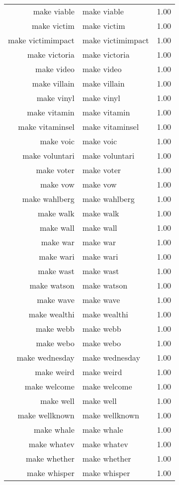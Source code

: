 \begin{table}[ht]
\begin{tabular}{rlr}
  make viable & make viable & 1.00 \\ 
  make victim & make victim & 1.00 \\ 
  make victimimpact & make victimimpact & 1.00 \\ 
  make victoria & make victoria & 1.00 \\ 
  make video & make video & 1.00 \\ 
  make villain & make villain & 1.00 \\ 
  make vinyl & make vinyl & 1.00 \\ 
  make vitamin & make vitamin & 1.00 \\ 
  make vitaminsel & make vitaminsel & 1.00 \\ 
  make voic & make voic & 1.00 \\ 
  make voluntari & make voluntari & 1.00 \\ 
  make voter & make voter & 1.00 \\ 
  make vow & make vow & 1.00 \\ 
  make wahlberg & make wahlberg & 1.00 \\ 
  make walk & make walk & 1.00 \\ 
  make wall & make wall & 1.00 \\ 
  make war & make war & 1.00 \\ 
  make wari & make wari & 1.00 \\ 
  make wast & make wast & 1.00 \\ 
  make watson & make watson & 1.00 \\ 
  make wave & make wave & 1.00 \\ 
  make wealthi & make wealthi & 1.00 \\ 
  make webb & make webb & 1.00 \\ 
  make webo & make webo & 1.00 \\ 
  make wednesday & make wednesday & 1.00 \\ 
  make weird & make weird & 1.00 \\ 
  make welcome & make welcome & 1.00 \\ 
  make well & make well & 1.00 \\ 
  make wellknown & make wellknown & 1.00 \\ 
  make whale & make whale & 1.00 \\ 
  make whatev & make whatev & 1.00 \\ 
  make whether & make whether & 1.00 \\ 
  make whisper & make whisper & 1.00 \\ 

\end{tabular}
\end{table}

